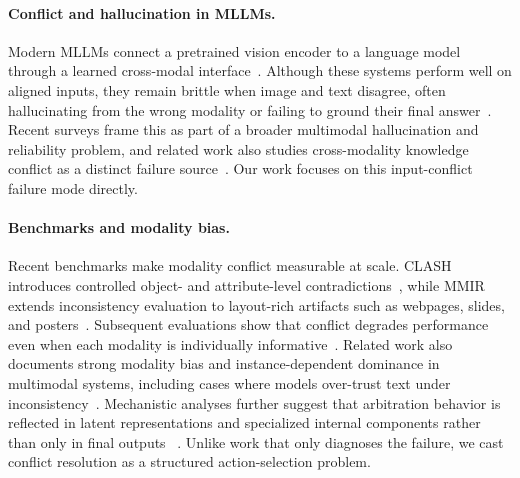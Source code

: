 \documentclass[11pt]{article}
\begin{document}
\paragraph{Conflict and hallucination in MLLMs.}
Modern MLLMs connect a pretrained vision encoder to a language model through a learned
cross-modal interface~\citep{liBLIP2BootstrappingLanguageImage2023,liuVisualInstructionTuning2023,daiInstructBLIPGeneralpurposeVisionLanguage2023}.
Although these systems perform well on aligned inputs, they remain brittle when image and
text disagree, often hallucinating from the wrong modality or failing to ground their final
answer~\citep{liEvaluatingObjectHallucination2023,faveroMultiModalHallucinationControl2024,sethSystematicEvaluationHallucinations2025}.
Recent surveys frame this as part of a broader multimodal hallucination and reliability
problem, and related work also studies cross-modality knowledge conflict as a distinct
failure source~\citep{chenSurveyMultimodalHallucination2025,zhuUnravelingCrossModalityKnowledge2024}.
Our work focuses on this input-conflict failure mode directly.

\paragraph{Benchmarks and modality bias.}
Recent benchmarks make modality conflict measurable at scale. CLASH introduces controlled
object- and attribute-level contradictions~\citep{popordanoskaCLASHBenchmarkCrossModal2025},
while MMIR extends inconsistency evaluation to layout-rich artifacts such as webpages,
slides, and posters~\citep{yanMultimodalInconsistencyReasoning2025}. Subsequent
evaluations show that conflict degrades performance even when each modality is individually
informative~\citep{zhangRobustMultimodalLarge2025}. Related work also documents strong
modality bias and instance-dependent dominance in multimodal systems, including cases where
models over-trust text under inconsistency~\citep{huaHowVisionLanguageModels2025,zhangWhenModalitiesConflict2025,jiaSeeingSoundHearing2025,dengWordsVisionVisionLanguage2025}.
Mechanistic analyses further suggest that arbitration behavior is reflected in latent
representations and specialized internal components rather than only in final outputs
~\citep{zhangEvaluatingSteeringModality2025,zhangInstructionAnchorsDissecting2026}.
Unlike work that only diagnoses the failure, we cast conflict resolution as a structured
action-selection problem.
\end{document}
